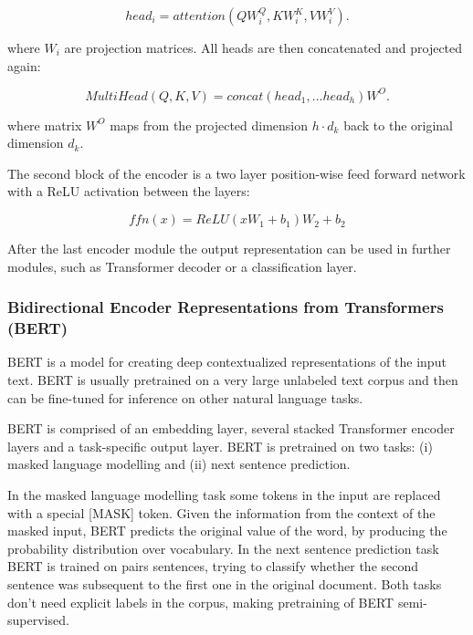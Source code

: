 \begin{equation}
    head_i = attention(QW_i^Q,KW_i^K,VW_i^V).
\end{equation}

where $W_i$ are projection matrices. All heads are then concatenated and projected again:

\begin{equation}
    MultiHead(Q, K, V) = concat(head_1,...head_h)W^O.
\end{equation}

where matrix $W^O$ maps from the projected dimension $h \cdot d_k$ back to the original dimension $d_k$. 

The second block of the encoder is a two layer position-wise feed forward network with a ReLU activation between the layers:

\begin{equation}
    ffn(x) = ReLU(xW_1+b_1)W_2+b_2
\end{equation}
 
After the last encoder module the output representation can be used in further modules, such as Transformer decoder or a classification layer.

\subsubsection{Bidirectional Encoder Representations from Transformers (BERT)}
\label{bert}

BERT \cite{devlin2018bert} is a model for creating deep contextualized representations of the input text. BERT is usually pretrained on a very large unlabeled text corpus and then can be fine-tuned for inference on other natural language tasks.

BERT is comprised of an embedding layer, several stacked Transformer encoder layers and a task-specific output layer. BERT is pretrained on two tasks: (i) masked language modelling and (ii) next sentence prediction.

In the masked language modelling task some tokens in the input are replaced with a special [MASK] token. Given the information from the context of the masked input, BERT predicts the original value of the word, by producing the probability distribution over vocabulary. In the next sentence prediction task BERT is trained on pairs sentences, trying to classify whether the second sentence was subsequent to the first one in the original document. Both tasks don't need explicit labels in the corpus, making pretraining of BERT semi-supervised.

